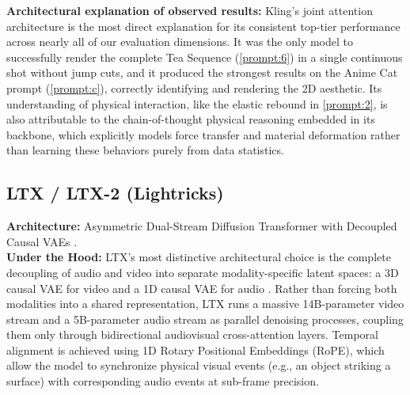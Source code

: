 \documentclass[sigconf]{acmart}
\begin{document}
\noindent\textbf{Architectural explanation of observed results:} Kling's
joint attention architecture is the most direct explanation for its
consistent top-tier performance across nearly all of our evaluation
dimensions. It was the only model to successfully render the complete
Tea Sequence (\ref{prompt:6}) in a single continuous shot without
jump cuts, and it produced the strongest results on the Anime Cat prompt
(\ref{prompt:c}), correctly identifying and rendering the 2D aesthetic. Its understanding of physical
interaction, like the elastic rebound in \ref{prompt:2}, is also attributable to the chain-of-thought physical reasoning
embedded in its backbone, which explicitly models force transfer and
material deformation rather than learning these behaviors purely from
data statistics.

\subsection{LTX / LTX-2 (Lightricks)}
\textbf{Architecture:} Asymmetric Dual-Stream Diffusion Transformer with
Decoupled Causal VAEs \cite{hacohen2026ltx}. \\

\noindent\textbf{Under the Hood:} LTX's most distinctive architectural
choice is the complete decoupling of audio and video into separate
modality-specific latent spaces: a 3D causal VAE for video and a 1D
causal VAE for audio \cite{hacohen2026ltx}. Rather than forcing both
modalities into a shared representation, LTX runs a massive 14B-parameter
video stream and a 5B-parameter audio stream as parallel denoising
processes, coupling them only through bidirectional audiovisual
cross-attention layers. Temporal alignment is achieved using 1D Rotary
Positional Embeddings (RoPE), which allow the model to synchronize
physical visual events (e.g., an object striking a surface) with
corresponding audio events at sub-frame precision.
\end{document}
